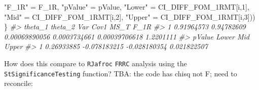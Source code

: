 \documentclass[
]{book}
\newenvironment{Shaded}{\begin{snugshade}}{\end{snugshade}}
\newcommand{\CommentTok}[1]{\textcolor[rgb]{0.56,0.35,0.01}{\textit{#1}}}
\newcommand{\DecValTok}[1]{\textcolor[rgb]{0.00,0.00,0.81}{#1}}
\newcommand{\NormalTok}[1]{#1}
\newcommand{\StringTok}[1]{\textcolor[rgb]{0.31,0.60,0.02}{#1}}
\begin{document}
\begin{Shaded}
\begin{Highlighting}[]
                   \StringTok{"F\_1R"}\NormalTok{ =}\StringTok{ }\NormalTok{F\_1R, }
                   \StringTok{"pValue"}\NormalTok{ =}\StringTok{ }\NormalTok{pValue,}
                   \StringTok{"Lower"}\NormalTok{ =}\StringTok{ }\NormalTok{CI\_DIFF\_FOM\_1RMT[i,}\DecValTok{1}\NormalTok{], }
                   \StringTok{"Mid"}\NormalTok{ =}\StringTok{ }\NormalTok{CI\_DIFF\_FOM\_1RMT[i,}\DecValTok{2}\NormalTok{], }
                   \StringTok{"Upper"}\NormalTok{ =}\StringTok{ }\NormalTok{CI\_DIFF\_FOM\_1RMT[i,}\DecValTok{3}\NormalTok{]))}
\NormalTok{\}}
\CommentTok{\#\textgreater{}      theta\_1    theta\_2           Var         Cov1          MS\_T      F\_1R}
\CommentTok{\#\textgreater{} 1 0.91964573 0.94782609 0.00069890056 0.0003734661 0.00039706618 1.2201111}
\CommentTok{\#\textgreater{}       pValue        Lower          Mid       Upper}
\CommentTok{\#\textgreater{} 1 0.26933885 {-}0.078183215 {-}0.028180354 0.021822507}
\end{Highlighting}
\end{Shaded}

How does this compare to \texttt{RJafroc} \texttt{FRRC} analysis using the \texttt{StSignificanceTesting} function?
TBA: the code has chisq not F; need to reconcile:
\end{document}
